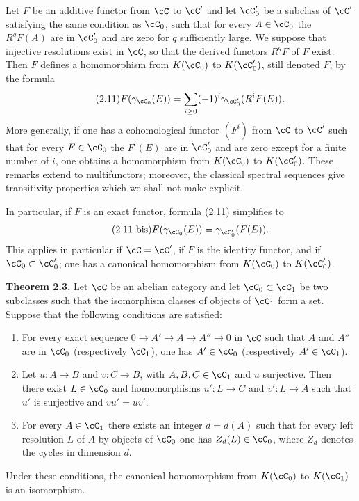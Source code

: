 Let $F$ be an additive functor from $\cC$ to $\cC'$ and let $\cC'_0$ be a subclass of $\cC'$ satisfying the same condition as $\cC_0$, such that for every $A\in\cC_0$ the $R^qF(A)$ are in $\cC'_0$ and are zero for $q$ sufficiently large. We suppose that injective resolutions exist in $\cC$, so that the derived functors $R^qF$ of $F$ exist. Then $F$ defines a homomorphism from $K(\cC_0)$ to $K(\cC'_0)$, still denoted $F$, by the formula
\begin{equation}\tag{2.11}
 F(\gamma_{\cC_0}(E))=\sum_{i\geq 0}(-1)^i\gamma_{\cC'_0}(R^iF(E)).
\end{equation}
More generally, if one has a cohomological functor $(F^i)$ from $\cC$ to $\cC'$ such that for every $E\in\cC_0$ the $F^i(E)$ are in $\cC'_0$ and are zero except for a finite number of $i$, one obtains a homomorphism from $K(\cC_0)$ to $K(\cC'_0)$. These remarks extend to multifunctors; moreover, the classical spectral sequences give transitivity properties which we shall not make explicit.

In particular, if $F$ is an exact functor, formula \hyperlink{sga6.e00.eq.2-11}{(2.11)} simplifies to
\begin{equation}\tag{2.11 bis}
 F(\gamma_{\cC_0}(E))=\gamma_{\cC'_0}(F(E)).
\end{equation}
This applies in particular if $\cC=\cC'$, if $F$ is the identity functor, and if $\cC_0\subset \cC'_0$; one has a canonical homomorphism from $K(\cC_0)$ to $K(\cC'_0)$.

\textbf{Theorem 2.3.} Let $\cC$ be an abelian category and let $\cC_0\subset \cC_1$ be two subclasses such that the isomorphism classes of objects of $\cC_1$ form a set. Suppose that the following conditions are satisfied:

\begin{enumerate}[label=(\roman*)]
\item For every exact sequence $0\to A'\to A\to A''\to 0$ in $\cC$ such that $A$ and $A''$ are in $\cC_0$ (respectively $\cC_1$), one has $A'\in\cC_0$ (respectively $A'\in\cC_1$).
\item Let $u:A\to B$ and $v:C\to B$, with $A,B,C\in\cC_1$ and $u$ surjective. Then there exist $L\in\cC_0$ and homomorphisms $u':L\to C$ and $v':L\to A$ such that $u'$ is surjective and $vu'=uv'$.
\item For every $A\in\cC_1$ there exists an integer $d=d(A)$ such that for every left resolution $L$ of $A$ by objects of $\cC_0$ one has $Z_d(L)\in\cC_0$, where $Z_d$ denotes the cycles in dimension $d$.
\end{enumerate}
Under these conditions, the canonical homomorphism from $K(\cC_0)$ to $K(\cC_1)$ is an isomorphism.

